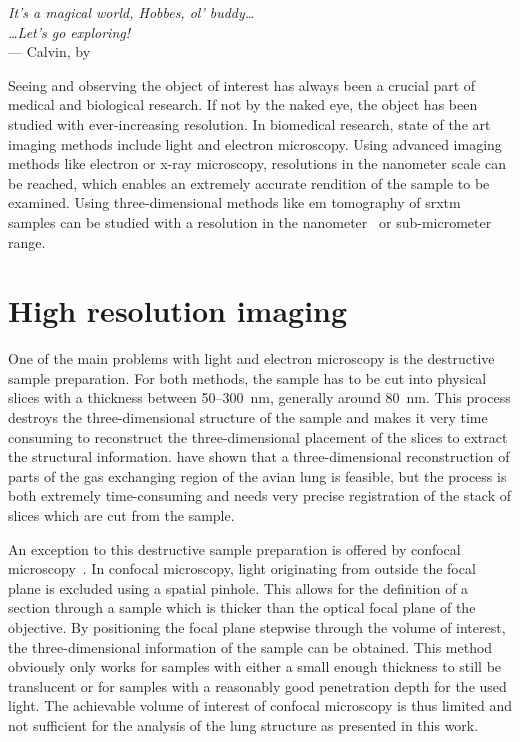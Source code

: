 \acresetall
{}\label{ch:Introduction}
\begin{flushright}{\slshape
		It's a magical world, Hobbes, ol' buddy\ldots\\
		\ldots Let's go exploring!}\\ \medskip
		--- Calvin, by \citep{Watterson1996}
\end{flushright}
\vspace{74mm}

Seeing and observing the object of interest has always been a crucial part of medical and biological research. If not by the naked eye, the object has been studied with ever-increasing resolution. In biomedical research, state of the art imaging methods include light and electron microscopy. Using advanced imaging methods like electron or x-ray microscopy, resolutions in the nanometer scale can be reached, which enables an extremely accurate rendition of the sample to be examined. Using three-dimensional methods like \ac{em} tomography of \ac{srxtm} samples can be studied with a resolution in the nanometer~\cite{Downing2007} or sub-micrometer~\cite{Stampanoni2010} range.

\section{High resolution imaging}
One of the main problems with light and electron microscopy is the destructive sample preparation. For both methods, the sample has to be cut into physical slices with a thickness between 50--\SI{300}{\nano\meter}, generally around \SI{80}{\nano\meter}. This process destroys the three-dimensional structure of the sample and makes it very time consuming to reconstruct the three-dimensional placement of the slices to extract the structural information. \citet{Woodward2005} have shown that a three-dimensional reconstruction of parts of the gas exchanging region of the avian lung is feasible, but the process is both extremely time-consuming and needs very precise registration of the stack of slices which are cut from the sample.

An exception to this destructive sample preparation is offered by confocal microscopy~\cite{Minsky1961}. In confocal microscopy, light originating from outside the focal plane is excluded using a spatial pinhole. This allows for the definition of a section through a sample which is thicker than the optical focal plane of the objective. By positioning the focal plane stepwise through the volume of interest, the three-dimensional information of the sample can be obtained. This method obviously only works for samples with either a small enough thickness to still be translucent or for samples with a reasonably good penetration depth for the used light. The achievable volume of interest of confocal microscopy is thus limited and not sufficient for the analysis of the lung structure as presented in this work. 

